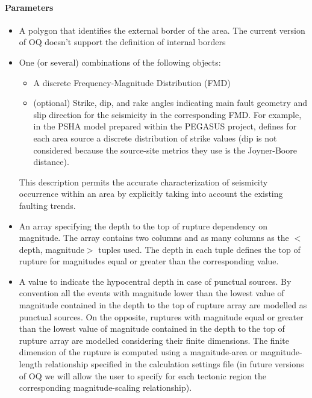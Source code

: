 \paragraph{Parameters}
\begin{itemize}
\item A polygon that identifies the external border of the area. 
The current version of OQ doesn't support the definition 
of internal borders
\item One (or several) combinations of the following objects:
\begin{itemize}
	\item A discrete Frequency-Magnitude Distribution (FMD)
	\item (optional) Strike, dip, and rake angles indicating 
	main fault geometry and slip direction for the seismicity  
	in the corresponding FMD.
	For example, in the PSHA model prepared within the PEGASUS project,
	\cite{coppersmith2009} defines for each area source a discrete 
	distribution of strike values (dip is not considered because the 
	source-site metrics they use is the Joyner-Boore distance). 
\end{itemize}
%
This description permits the accurate characterization of seismicity 
occurrence within an area by explicitly taking into account the existing 
faulting trends. 
%
\item An array specifying the depth to the top of rupture dependency on 
magnitude. The array contains two columns and as many columns as the 
$<$depth, magnitude$>$ tuples used. 
The depth in each tuple defines the top of rupture for magnitudes equal 
or greater than the corresponding value. 
%
\item A value to indicate the hypocentral depth in case of punctual sources. 
By convention all the events with magnitude lower than the lowest value of 
magnitude contained in the depth to the top of rupture array are modelled as 
punctual sources. 
%
On the opposite, ruptures with magnitude equal or greater than 
the lowest value of magnitude contained in the depth to the top of rupture array 
are modelled considering their finite dimensions. The finite dimension of the 
rupture is computed using a magnitude-area or magnitude-length relationship 
specified in the calculation settings file (in future versions of OQ we will 
allow the user to specify for each tectonic region the corresponding 
magnitude-scaling relationship).
\end{itemize}
%

